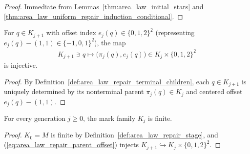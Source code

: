 \begin{proof}
    \leanok
    Immediate from Lemmas~\ref{thm:area_law_initial_stars} and
    \ref{thm:area_law_uniform_repair_induction_conditional}.
\end{proof}

\begin{lemma}
    \label{thm:area_law_repair_parent_offset}
    \leanok
    For $q\in K_{j+1}$ with offset index $e_j(q)\in\{0,1,2\}^2$ (representing $e_j(q)-(1,1)\in\{-1,0,1\}^2$),
    the map
    \begin{align}
        K_{j+1}\ni q\longmapsto\bigl(\pi_j(q),e_j(q)\bigr)\in K_j\times\{0,1,2\}^2
        \label{eq:area_law_repair_parent_offset}
    \end{align}
    is injective.
\end{lemma}
\begin{proof}\leanok
    By Definition~\ref{def:area_law_repair_terminal_children}, each $q\in K_{j+1}$ is uniquely
    determined by its nonterminal parent $\pi_j(q)\in K_j$ and centered offset $e_j(q)-(1,1)$.
\end{proof}

\begin{lemma}
    \label{thm:area_law_repair_finite_marks}
    \leanok
    For every generation $j\ge0$, the mark family $K_j$ is finite.
\end{lemma}
\begin{proof}\leanok
    $K_0=M$ is finite by Definition~\ref{def:area_law_repair_stage}, and
    (\ref{eq:area_law_repair_parent_offset}) injects $K_{j+1}\hookrightarrow K_j\times\{0,1,2\}^2$.
\end{proof}

